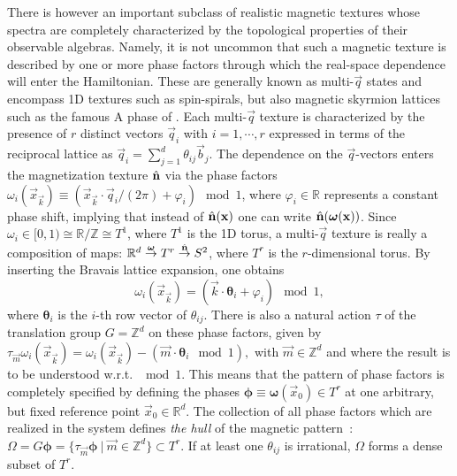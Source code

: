 \documentclass[
    aps,
    prl,
    twocolumn,
    floatfix,
    superscriptaddress
]{revtex4-2}
\begin{document}
There is however an important subclass of realistic magnetic textures whose spectra are completely characterized by the topological properties of their observable algebras.
Namely, it is not uncommon that such a magnetic texture is described by one or more phase factors through which the real-space dependence will enter the Hamiltonian. 
These are generally known as multi-$\vec{q}$ states and encompass 1D textures such as spin-spirals, but also magnetic skyrmion lattices such as the famous A phase of .
Each multi-$\vec{q}$ texture is characterized by
the presence of $r$ distinct vectors $\vec{q}_i$ with $i=1,\cdots,r$ expressed in terms of the reciprocal lattice as $\vec{q}_i = \sum_{j=1}^d \theta_{ij} \vec{b}_j$.
The dependence on the $\vec{q}$-vectors enters the magnetization texture $\hat{\mathbf{n}}$ via the
phase factors 
$
    \omega_i (\vec{x}_\vec{k}) \equiv  (\vec{x}_\vec{k}  \cdot \vec{q}_i/ (2\pi) + \varphi_i) \mod 1 
$, where $\varphi_i \in \mathbb{R}$ represents a constant phase shift, implying that instead of $\hat{\mathbf{n}}(\mathbf{x})$  one can write $\hat{\mathbf{n}}( \boldsymbol{\omega} (\mathbf{x}) )$.
Since $\omega_i \in [0,1) \cong \mathbb{R}/ \mathbb{Z} \cong T^1$, where $T^1$ is the 1D torus, a multi-$\vec{q}$ texture is really a composition of maps: $\mathbb{R}^d \overset{\boldsymbol{\omega}}{\rightarrow} T^r
     \overset{\hat{\mathbf{n}}}{\rightarrow} S^2 $, where $T^r$ is the $r$-dimensional torus.
By inserting the Bravais lattice expansion, one obtains
\begin{equation}
    \omega_i (\vec{x}_\vec{k}) = \left(
      \vec{k} \cdot \boldsymbol{\theta}_i
     + \varphi_i
    \right) \mod 1,
\end{equation}
where $\boldsymbol{\theta}_i$ is the $i$-th row vector of $\theta_{ij}$.
There is also a natural action $\tau$ of the translation group $G=\mathbb{Z}^d$ on these phase factors, given by
$
    \tau_{\vec{m}}\omega_i (\vec{x}_\vec{k}) =\omega_i (\vec{x}_\vec{k} ) - ( \vec{m} \cdot \boldsymbol{\theta}_i \mod 1) ,
$
with $\vec{m}\in \mathbb{Z}^d$ and where the result is to be understood w.r.t. $\mod 1$.
This means that the pattern of phase factors is completely specified by defining the phases  $\boldsymbol{\phi} \equiv \boldsymbol{\omega}(\vec{x}_0) \in T^r$  at one arbitrary, but fixed reference point $\vec{x}_0 \in \mathbb{R}^d$.
The collection of all phase factors which are realized in the system defines {\it the hull} of the magnetic pattern~\cite{Bellissard2000}:
$
    \Omega = G\boldsymbol{\phi}= \lbrace \tau_{\vec{m}}\boldsymbol{\phi} ~|~ \vec{m} \in \mathbb{Z}^d \rbrace  \subset T^r 
$.
If at least one $\theta_{ij}$ is irrational, $\Omega$ forms a dense subset of $T^r$.
\end{document}

